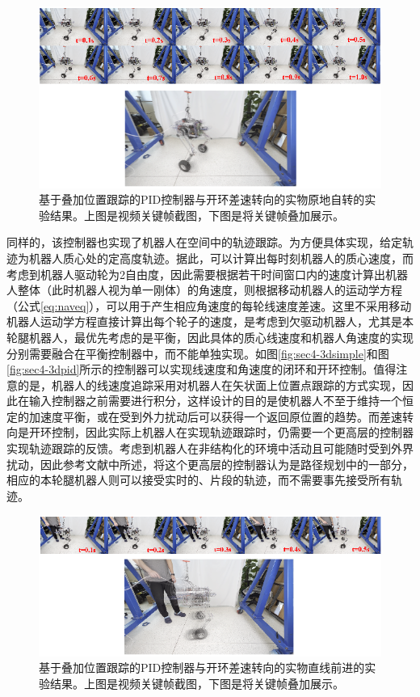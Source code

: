 \begin{figure}[h!]
  \centering
  \includegraphics[width=1.0\linewidth]{figures/Sec5/rot.png}
  \caption{
  基于叠加位置跟踪的PID控制器与开环差速转向的实物原地自转的实验结果。上图是视频关键帧截图，下图是将关键帧叠加展示。
  }
  \label{fig:sec5-rot}
   \vspace{6pt}
\end{figure}

同样的，该控制器也实现了机器人在空间中的轨迹跟踪。为方便具体实现，给定轨迹为机器人质心处的定高度轨迹。据此，可以计算出每时刻机器人的质心速度，而考虑到机器人驱动轮为2自由度，因此需要根据若干时间窗口内的速度计算出机器人整体（此时机器人视为单一刚体）的角速度，则根据移动机器人的运动学方程（公式\ref{eq:naveq}），可以用于产生相应角速度的每轮线速度差速。这里不采用移动机器人运动学方程直接计算出每个轮子的速度，是考虑到欠驱动机器人，尤其是本轮腿机器人，最优先考虑的是平衡，因此具体的质心线速度和机器人角速度的实现分别需要融合在平衡控制器中，而不能单独实现。如图\ref{fig:sec4-3dsimple}和图\ref{fig:sec4-3dpid}所示的控制器可以实现线速度和角速度的闭环和开环控制。值得注意的是，机器人的线速度追踪采用对机器人在矢状面上位置点跟踪的方式实现，因此在输入控制器之前需要进行积分，这样设计的目的是使机器人不至于维持一个恒定的加速度平衡，或在受到外力扰动后可以获得一个返回原位置的趋势。而差速转向是开环控制，因此实际上机器人在实现轨迹跟踪时，仍需要一个更高层的控制器实现轨迹跟踪的反馈。考虑到机器人在非结构化的环境中活动且可能随时受到外界扰动，因此参考文献\cite{klemm2019ascento}中所述，将这个更高层的控制器认为是路径规划中的一部分，相应的本轮腿机器人则可以接受实时的、片段的轨迹，而不需要事先接受所有轨迹。


\begin{figure}[h]
  \centering
  \includegraphics[width=1.0\linewidth]{figures/Sec5/movfd.png}
  \caption{
  基于叠加位置跟踪的PID控制器与开环差速转向的实物直线前进的实验结果。上图是视频关键帧截图，下图是将关键帧叠加展示。
  }
  \label{fig:sec5-movfd}
   \vspace{6pt}
\end{figure}


